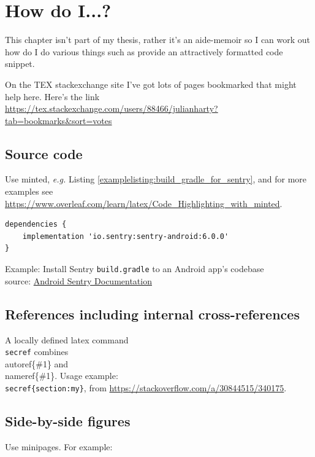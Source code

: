 \chapter{How do I...?}
This chapter isn't part of my thesis, rather it's an aide-memoir so I can work out how do I do various things such as provide an attractively formatted code snippet.

On the TEX stackexchange site I've got lots of pages bookmarked that might help here. Here's the link \url{https://tex.stackexchange.com/users/88466/julianharty?tab=bookmarks&sort=votes}

\section{Source code}
Use minted, \textit{e.g.} Listing \ref{examplelisting:build_gradle_for_sentry}, and for more examples see \url{https://www.overleaf.com/learn/latex/Code_Highlighting_with_minted}.

\begin{listing}
\begin{verbatim}
dependencies {
    implementation 'io.sentry:sentry-android:6.0.0'
}
\end{verbatim}
\caption{Example: Install Sentry \texttt{build.gradle} to an Android app's codebase\\source: \href{https://docs.sentry.io/platforms/android/}{Android Sentry Documentation}}
\label{examplelisting:build_gradle_for_sentry}
\end{listing}

\section{References including internal cross-references}
A locally defined latex command \texttt{\\secref{}} combines \\autoref\{\#1\} and \\nameref\{\#1\}. 
Usage example: \texttt{\\secref\{section:my\}}, from \url{https://stackoverflow.com/a/30844515/340175}.

\section{Side-by-side figures}
Use minipages. For example:


